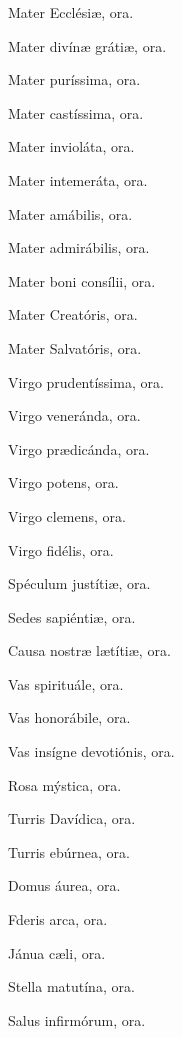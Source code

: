 \noindent Mater Ecclésiæ,  \hfill ora.

\noindent Mater divínæ grátiæ, \hfill ora.

\noindent Mater puríssima, \hfill ora.

\noindent Mater castíssima,   
 \hfill ora.
 
\noindent Mater invioláta,  
\hfill ora.
 
\noindent Mater intemeráta,  \hfill
 ora.
 
\noindent Mater amábilis,  
 \hfill ora.
 
\noindent Mater admirábilis, \hfill
 ora.
 
\noindent Mater boni consílii,  \hfill
 ora.
 
\noindent Mater Creatóris, \hfill
 ora.
 
\noindent Mater Salvatóris, \hfill
 ora.
 
\noindent Virgo prudentíssima, \hfill
 ora.
 
\noindent Virgo veneránda, \hfill   
 ora.
 
\noindent Virgo prædicánda, \hfill  
 ora.
 
\noindent *Virgo potens, \hfill
 ora.
 
\noindent *Virgo clemens, \hfill  
 ora.
 
\noindent Virgo fidélis, \hfill  
 ora.
 
\noindent Spéculum justítiæ, \hfill  
 ora.
 
\noindent Sedes sapiéntiæ, \hfill  
 ora.
 
\noindent Causa nostræ lætítiæ, \hfill
 ora.
 
\noindent Vas spirituále, \hfill 
 ora.
 
\noindent Vas honorábile, \hfill  
 ora.
 
\noindent Vas insígne devotiónis, \hfill 
 ora.
 
\noindent *Rosa mýstica, \hfill  
 ora.
 
\noindent Turris Davídica, \hfill  
 ora.
 
\noindent Turris ebúrnea, \hfill  
 ora.
 
\noindent *Domus áurea, \hfill
 ora.
 
\noindent F\ooalign{\hss\kern.2ex\'{}\hss\crcr\oe}deris arca, \hfill
 ora.
 
\noindent Jánua cæli,  \hfill
 ora.
 
\noindent Stella matutína, \hfill  
 ora.
 
\noindent Salus infirmórum, \hfill
 ora.
 
